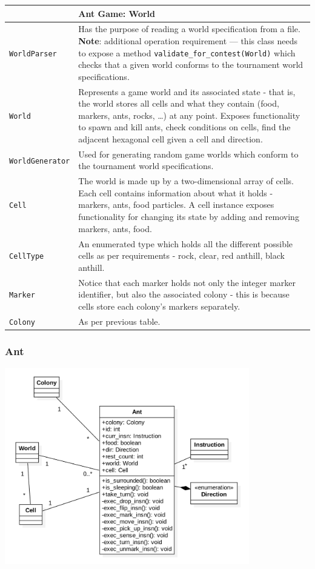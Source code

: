 \documentclass[11pt]{article}
\begin{document}
\begin{longtable}[c]{@{}p{}p{}@{}}
\toprule
& Ant Game: World \tabularnewline
\midrule
\texttt{WorldParser} & Has the purpose of reading a world specification from a file. \textbf{Note}: additional operation requirement --- this class needs to expose a method \texttt{validate\_for\_contest(World)} which checks that a given world conforms to the tournament world specifications. \tabularnewline
\texttt{World} & Represents a game world and its associated state - that is, the world stores all cells and what they contain (food, markers, ants, rocks, \ldots) at any point. Exposes functionality to spawn and kill ants, check conditions on cells, find the adjacent hexagonal cell given a cell and direction. \tabularnewline
\texttt{WorldGenerator} & Used for generating random game worlds which conform to the tournament world specifications. \tabularnewline
\texttt{Cell} & The world is made up by a two-dimensional array of cells. Each cell contains information about what it holds - markers, ants, food particles. A cell instance exposes functionality for changing its state by adding and removing markers, ants, food. \tabularnewline
\texttt{CellType} & An enumerated type which holds all the different possible cells as per requirements - rock, clear, red anthill, black anthill. \tabularnewline
\texttt{Marker} & Notice that each marker holds not only the integer marker identifier, but also the associated colony - this is because cells store each colony's markers separately. \tabularnewline
\texttt{Colony} & As per previous table. \tabularnewline
\bottomrule
\end{longtable}

\subsubsection{Ant}

\begin{center}
\includegraphics[width=0.8\textwidth]{low-level-diagrams/class/ant.png}
\end{center}
\end{document}
